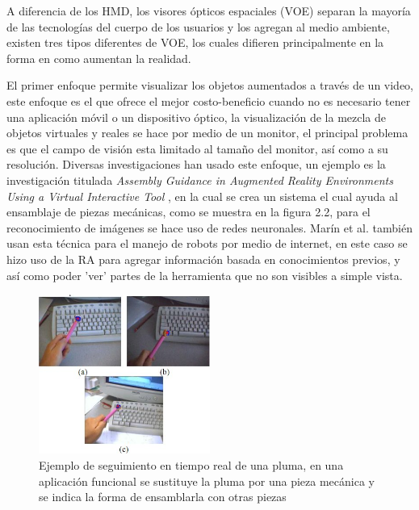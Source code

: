 \documentclass[12pt,a4paper,spanish,openany]{book}
\begin{document}
A diferencia de los HMD, los visores ópticos espaciales
(VOE) separan la mayoría de las tecnologías del cuerpo de los usuarios y los
agregan al medio ambiente, existen tres tipos diferentes de VOE, los cuales
difieren principalmente en la forma en como aumentan la realidad.

El primer enfoque permite visualizar los objetos aumentados a través de un
video, este enfoque es el que ofrece el mejor costo-beneficio cuando no es
necesario tener una aplicación móvil o un dispositivo óptico, la visualización
de la mezcla de objetos virtuales y reales se hace por medio  de un monitor, el
principal problema es que el campo de visión esta limitado al tamaño del
monitor, así como a su resolución. 
Diversas investigaciones han usado este enfoque, un ejemplo es la investigación
titulada \emph{Assembly Guidance in Augmented Reality Environments Using a
Virtual Interactive Tool} \cite{agar}, en la cual se crea un sistema el cual
ayuda al ensamblaje de piezas mecánicas, como se muestra en la figura 2.2, para
el reconocimiento de imágenes se hace uso de redes neuronales. Marín et al. también usan esta técnica para el
manejo de robots por medio de internet, en este caso se hizo uso de la RA para
agregar información  basada en conocimientos previos, y así  como poder 'ver'
partes de la herramienta que no son visibles a simple vista.

\begin{figure}
\begin{center}
\includegraphics[width=0.5\textwidth]{./img/assemblyGuidance.jpg}
\caption{Ejemplo de seguimiento en tiempo real de una pluma, en una aplicación
funcional se sustituye la pluma por una pieza mecánica y se indica la forma de
ensamblarla con otras piezas}
\end{center}
\end{figure}
\end{document}
